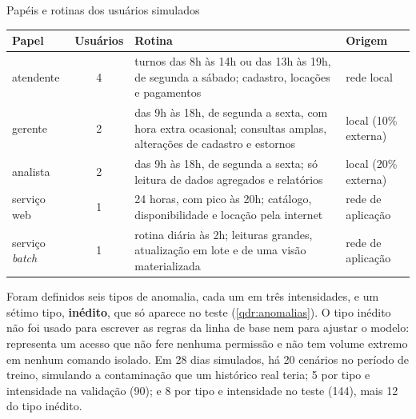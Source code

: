 \begin{quadro}[htb]
    \centering
    \ABNTEXfontereduzida
    \begin{minipage}{\textwidth}
        \caption{\label{qdr:perfis}Papéis e rotinas dos usuários simulados}
        \begin{tabular}{|L{2.4cm}|c|L{7.6cm}|L{2.9cm}|}
            \hline
            \textbf{Papel} & \textbf{Usuários} & \textbf{Rotina} & \textbf{Origem} \\
            \hline
            atendente & 4 & turnos das 8h às 14h ou das 13h às 19h, de segunda a sábado;
            cadastro, locações e pagamentos & rede local \\
            \hline
            gerente & 2 & das 9h às 18h, de segunda a sexta, com hora extra ocasional; consultas
            amplas, alterações de cadastro e estornos & local (10\% externa) \\
            \hline
            analista & 2 & das 9h às 18h, de segunda a sexta; só leitura de dados agregados e
            relatórios & local (20\% externa) \\
            \hline
            serviço web & 1 & 24 horas, com pico às 20h; catálogo, disponibilidade e locação
            pela internet & rede de aplicação \\
            \hline
            serviço \textit{batch} & 1 & rotina diária às 2h; leituras grandes, atualização em
            lote e de uma visão materializada & rede de aplicação \\
            \hline
        \end{tabular}
    \end{minipage}
\end{quadro}

Foram definidos seis tipos de anomalia, cada um em três intensidades, e um sétimo tipo,
\textbf{inédito}, que só aparece no teste (\autoref{qdr:anomalias}). O tipo inédito não foi
usado para escrever as regras da linha de base nem para ajustar o modelo: representa um acesso
que não fere nenhuma permissão e não tem volume extremo em nenhum comando isolado. Em 28 dias
simulados, há 20 cenários no período de treino, simulando a contaminação que um histórico real
teria; 5 por tipo e intensidade na validação (90); e 8 por tipo e intensidade no teste (144),
mais 12 do tipo inédito.

